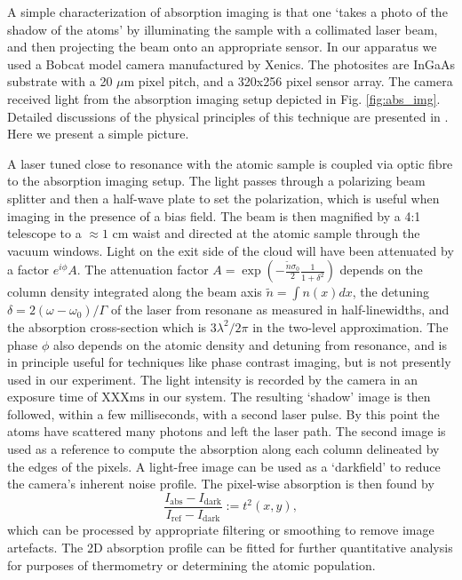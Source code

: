 A simple characterization of absorption imaging is that one `takes a photo of the shadow of the atoms' by illuminating the sample with a collimated laser beam, and then projecting the beam onto an appropriate sensor. In our apparatus we used a Bobcat model camera manufactured by Xenics. The photosites are InGaAs substrate with a 20 $\mu$m pixel pitch, and a 320x256 pixel sensor array. The camera received light from the absorption imaging setup depicted in Fig. \ref{fig:abs_img}. Detailed discussions of the physical principles of this technique are presented in \cite{MakingProbingUnderstanding,TychkovThesis}. Here we present a simple picture.

A laser tuned close to resonance with the atomic sample is coupled via optic fibre to the absorption imaging setup. The light passes through a polarizing beam splitter and then a half-wave plate to set the polarization, which is useful when imaging in the presence of a bias field. The beam is then magnified by a 4:1 telescope to a $\approx1$ cm waist and directed at the atomic sample through the vacuum windows. Light on the exit side of the cloud will have been attenuated by a factor $e^{i\phi}A$.  The attenuation factor $A=\exp(-\frac{\tilde{n}\sigma_0}{2}\frac{1}{1+\delta^2})$ depends on the column density integrated along the beam axis $\tilde{n} = \int n(x) dx$, the detuning $\delta=2(\omega-\omega_0)/\Gamma$ of the laser from resonane as measured in half-linewidths, and the absorption cross-section which is $3\lambda^2/2\pi$ in the two-level approximation. The phase $\phi$ also depends on the atomic density and detuning from resonance, and is in principle useful for techniques like phase contrast imaging, but is not presently used in our experiment. The light intensity is recorded by the camera in an exposure time of XXXms in our system. The resulting `shadow' image is then followed, within a few milliseconds, with a second laser pulse. By this point the atoms have scattered many photons and left the laser path. The second image is used as a reference to compute the absorption along each column delineated by the edges of the pixels. A light-free image can be used as a `darkfield' to reduce the camera's inherent noise profile. The pixel-wise absorption is then found by
\begin{equation}
	\frac{I_\textrm{abs}-I_\textrm{dark}}{I_\textrm{ref}-I_\textrm{dark}}:=t^2(x,y),
\end{equation}
which can be processed by appropriate filtering or smoothing to remove image artefacts. The 2D absorption profile can be fitted for further quantitative analysis for purposes of thermometry or determining the atomic population.

